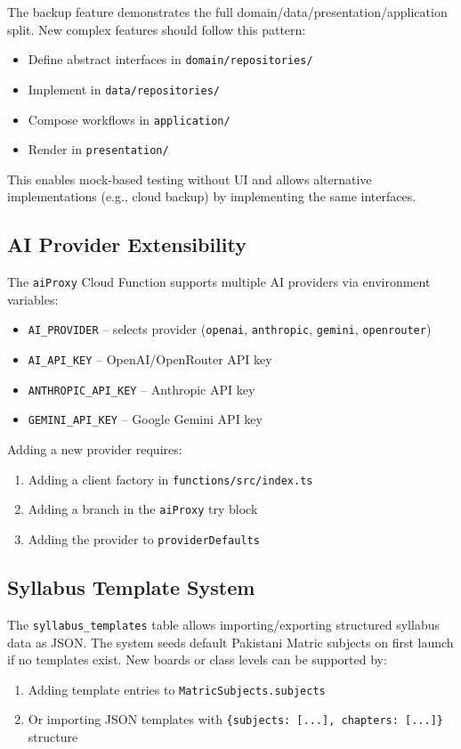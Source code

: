 \documentclass[12pt,a4paper,openany]{report}
\begin{document}
The backup feature demonstrates the full domain/data/presentation/application split. New complex features should follow this pattern:
\begin{itemize}[leftmargin=*]
  \item Define abstract interfaces in \texttt{domain/repositories/}
  \item Implement in \texttt{data/repositories/}
  \item Compose workflows in \texttt{application/}
  \item Render in \texttt{presentation/}
\end{itemize}

This enables mock-based testing without UI and allows alternative implementations (e.g., cloud backup) by implementing the same interfaces.

\subsection{AI Provider Extensibility}

The \texttt{aiProxy} Cloud Function supports multiple AI providers via environment variables:
\begin{itemize}[leftmargin=*]
  \item \texttt{AI\_PROVIDER} -- selects provider (\texttt{openai}, \texttt{anthropic}, \texttt{gemini}, \texttt{openrouter})
  \item \texttt{AI\_API\_KEY} -- OpenAI/OpenRouter API key
  \item \texttt{ANTHROPIC\_API\_KEY} -- Anthropic API key
  \item \texttt{GEMINI\_API\_KEY} -- Google Gemini API key
\end{itemize}

Adding a new provider requires:
\begin{enumerate}[leftmargin=*]
  \item Adding a client factory in \texttt{functions/src/index.ts}
  \item Adding a branch in the \texttt{aiProxy} try block
  \item Adding the provider to \texttt{providerDefaults}
\end{enumerate}

\subsection{Syllabus Template System}

The \texttt{syllabus\_templates} table allows importing/exporting structured syllabus data as JSON. The system seeds default Pakistani Matric subjects on first launch if no templates exist. New boards or class levels can be supported by:
\begin{enumerate}[leftmargin=*]
  \item Adding template entries to \texttt{MatricSubjects.subjects}
  \item Or importing JSON templates with \texttt{\{subjects: [...], chapters: [...]\}} structure
\end{enumerate}
\end{document}
